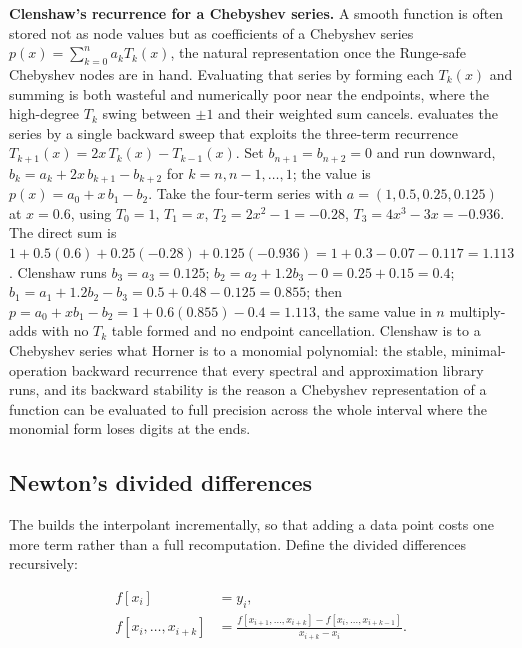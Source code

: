 \begin{example}
\textbf{Clenshaw's recurrence for a Chebyshev series.} A smooth function is
often stored not as node values but as coefficients of a Chebyshev series
$p(x) = \sum_{k=0}^{n} a_{k} T_{k}(x)$, the natural representation once the
Runge-safe Chebyshev nodes are in hand. Evaluating that series by forming
each $T_{k}(x)$ and summing is both wasteful and numerically poor near the
endpoints, where the high-degree $T_{k}$ swing between $\pm 1$ and their
weighted sum cancels.  evaluates the series by
a single backward sweep that exploits the three-term recurrence $T_{k+1}(x) =
2 x\, T_{k}(x) - T_{k-1}(x)$. Set $b_{n+1} = b_{n+2} = 0$ and run downward,
$b_{k} = a_{k} + 2 x\, b_{k+1} - b_{k+2}$ for $k = n, n-1, \ldots, 1$; the
value is $p(x) = a_{0} + x\, b_{1} - b_{2}$. Take the four-term series with
$a = (1, 0.5, 0.25, 0.125)$ at $x = 0.6$, using $T_{0} = 1$, $T_{1} = x$,
$T_{2} = 2x^{2} - 1 = -0.28$, $T_{3} = 4x^{3} - 3x = -0.936$. The direct sum
is $1 + 0.5(0.6) + 0.25(-0.28) + 0.125(-0.936) = 1 + 0.3 - 0.07 - 0.117 =
1.113$. Clenshaw runs $b_{3} = a_{3} = 0.125$; $b_{2} = a_{2} + 1.2 b_{3} -
0 = 0.25 + 0.15 = 0.4$; $b_{1} = a_{1} + 1.2 b_{2} - b_{3} = 0.5 + 0.48 -
0.125 = 0.855$; then $p = a_{0} + x b_{1} - b_{2} = 1 + 0.6(0.855) - 0.4 =
1.113$, the same value in $n$ multiply-adds with no $T_{k}$ table formed and
no endpoint cancellation. Clenshaw is to a Chebyshev series what Horner is to
a monomial polynomial: the stable, minimal-operation backward recurrence that
every spectral and approximation library runs, and its backward stability is
the reason a Chebyshev representation of a function can be evaluated to full
precision across the whole interval where the monomial form loses digits at
the ends.
\end{example}

\subsection{Newton's divided differences}

The  builds the interpolant
incrementally, so that adding a data point costs one more term
rather than a full recomputation. Define the divided differences
recursively:

\begin{align*}
f[x_{i}] &= y_{i}, \\
f[x_{i}, \ldots, x_{i+k}] &= \frac{f[x_{i+1}, \ldots, x_{i+k}]
- f[x_{i}, \ldots, x_{i+k-1}]}{x_{i+k} - x_{i}}.
\end{align*}

